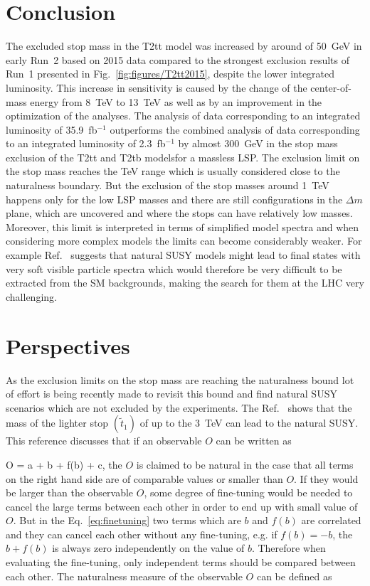 \section{Conclusion}

The excluded stop mass in the T2tt model was increased by around of 50~GeV in early Run~2 based on 2015 data compared to the strongest exclusion results of Run~1 presented in Fig.~\ref{fig:figures/T2tt2015}, despite the lower integrated luminosity. This increase in sensitivity is caused by the change of the center-of-mass energy from 8~TeV to 13~TeV as well as by an improvement in the optimization of the analyses. The analysis of data corresponding to an integrated luminosity of 35.9~fb$^{-1}$ outperforms the combined analysis of data corresponding to an integrated luminosity of 2.3~fb$^{-1}$ by almost 300~GeV in the stop mass exclusion of the T2tt and T2tb modelsfor a massless LSP. The exclusion limit on the stop mass reaches the TeV range which is usually considered close to the naturalness boundary. But the exclusion of the stop masses around 1~TeV happens only for the low LSP masses and there are still configurations in the $\Delta m$ plane, which are uncovered and where the stops can have relatively low masses. Moreover, this limit is interpreted in terms of simplified model spectra and when considering more complex models the limits can become considerably weaker. For example Ref.~\cite{Baer:2012uy} suggests that natural SUSY models might lead to final states with very soft visible particle spectra which would therefore be very difficult to be extracted from the SM backgrounds, making the search for them at the LHC very challenging.%


\newpage

\section{Perspectives}

As the exclusion limits on the stop mass are reaching the naturalness bound lot of effort is being recently made to revisit this bound and find natural SUSY scenarios which are not excluded by the experiments. The Ref.~\cite{Baer:2016bwh} shows that the mass of the lighter stop $(\tilde{t}_{1})$ of up to the 3~TeV can lead to the natural SUSY. This reference discusses that if an observable $O$ can be written as

{
O = a + b + f(b) + c,
}
the $O$ is claimed to be natural in the case that all terms on the right hand side are of comparable values or smaller than $O$. If they would be larger than the observable $O$, some degree of fine-tuning would be needed to cancel the large terms between each other in order to end up with small value of $O$. But in the Eq.~\ref{eq:finetuning} two terms which are $b$ and $f(b)$ are correlated and they can cancel each other without any fine-tuning, e.g. if $f(b) = -b$, the $b+f(b)$ is always zero independently on the value of $b$. Therefore when evaluating the fine-tuning, only independent terms should be compared between each other. The naturalness measure of the observable $O$ can be defined as 

